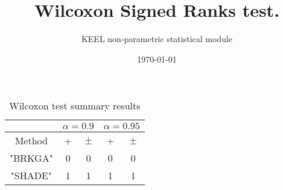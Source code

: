 \documentclass[a4paper,10pt]{article}
\title{Wilcoxon Signed Ranks test.}
\date{\today}
\author{KEEL non-parametric statistical module}
\begin{document}
\pagestyle{empty}
\maketitle
\thispagestyle{empty}


\begin{sidewaystable}[!htp]
\centering\scriptsize
{}
\caption{Ranks computed by the Wilcoxon test}

\end{sidewaystable}

 \clearpage 


\begin{sidewaystable}[!htp]
\centering\scriptsize
{}
\caption{Summary of the Wilcoxon test. \textbullet = the method in the row improves the method of the column. \textopenbullet = the method in the column improves the method of the row. Upper diagonal of level significance $\alpha=0.9$,Lower diagonal level of significance $\alpha=0.95$}

\end{sidewaystable}

 \clearpage 


\begin{table}[!htp]
\centering\scriptsize
\begin{tabular}{
|c|c|c|c|c|}
\hline
&\multicolumn{2}{c|}{$\alpha=0.9$} & \multicolumn{2}{c|}{$\alpha=0.95$}\\\hline
Method & + & $\pm$ & + & $\pm$ \\
\hline
"BRKGA" & 0 & 0 & 0 & 0\\
\hline
"SHADE" & 1 & 1 & 1 & 1\\
\hline

\end{tabular}
\caption{Wilcoxon test summary results}

\end{table}

 \clearpage 
\end{document}
